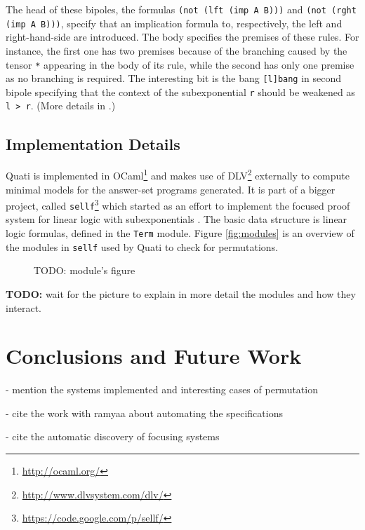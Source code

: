 \documentclass{llncs}
\begin{document}
The head of these bipoles, the formulas \texttt{(not (lft (imp A B)))} and
\texttt{(not (rght (imp A B)))}, specify that an implication formula to, respectively, 
the left and right-hand-side are introduced. The body specifies the premises of these
rules. For instance, the first one has two premises because of the branching caused by the  
tensor \texttt{*} appearing in the body of its rule, while
the second has only one premise as no branching is required. 
The interesting bit is the bang \texttt{[l]bang} in second bipole specifying that the 
context of the subexponential \texttt{r} should be weakened as \texttt{l > r}. (More details
in \cite{nigam.jlc}.) 

\subsection{Implementation Details}

Quati is implemented in OCaml\footnote{\url{http://ocaml.org/}} and makes use of
DLV\footnote{\url{http://www.dlvsystem.com/dlv/}} externally to compute minimal models for the
answer-set programs generated. It is part of a bigger project, called
\texttt{sellf}\footnote{\url{https://code.google.com/p/sellf/}} which started as an effort to
implement the focused proof system for linear logic with subexponentials
\cite{vivek's thesis}. The basic data structure is linear logic formulas,
defined in the \texttt{Term} module. Figure \ref{fig:modules} is an overview
of the modules in \texttt{sellf} used by Quati to check for permutations.

\begin{figure}
TODO: module's figure
\end{figure}

\textbf{TODO:} wait for the picture to explain in more detail the modules and how they
interact.

\section{Conclusions and Future Work}

- mention the systems implemented and interesting cases of permutation

- cite the work with ramyaa about automating the specifications

- cite the automatic discovery of focusing systems

\appendix
\begin{landscape}

\end{landscape}
\end{document}
